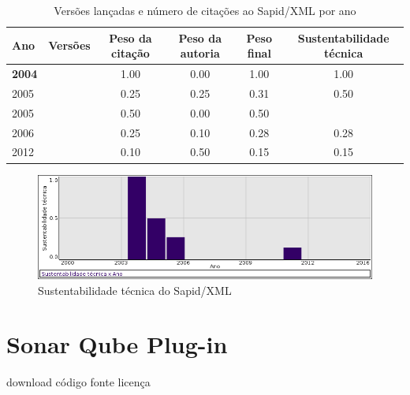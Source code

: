 \begin{table}[H]
\caption{Versões lançadas e número de citações ao Sapid/XML por ano}
\centering
\begin{tabular}{| l | c | c | c | c | c |}
  \hline
  Ano & Versões & Peso da citação & Peso da autoria & Peso final & Sustentabilidade técnica \\
  \hline
            {\bf 2004}
          &
          
          &
          1.00
          &
          0.00
          &
          1.00
          &
            {\color{blue} 1.00}
          \\
\hline
            2005
          &
          
          &
          0.25
          &
          0.25
          &
          0.31
          &
            {\color{blue} 0.50}
          \\
            2005
          &
          
          &
          0.50
          &
          0.00
          &
          0.50
          &
          \\
\hline
            2006
          &
          
          &
          0.25
          &
          0.10
          &
          0.28
          &
            {\color{red} 0.28}
          \\
\hline
            2012
          &
          
          &
          0.10
          &
          0.50
          &
          0.15
          &
            {\color{red} 0.15}
          \\
\hline
\end{tabular}
\end{table}

\begin{figure}[h]
  \center
  \includegraphics[scale=0.50]{imagens/softwares-charts/sapid-xml.png}
  \caption{Sustentabilidade técnica do Sapid/XML}
\end{figure}


\section{Sonar Qube Plug-in}
\checkmark download
\checkmark código fonte
\checkmark licença


